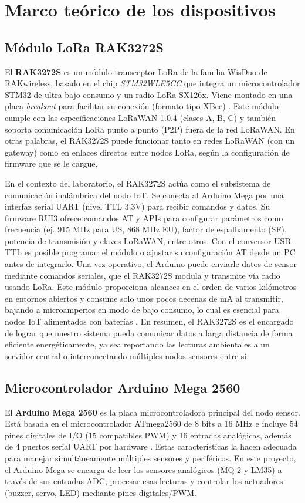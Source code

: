 \section{Marco teórico de los dispositivos}

\subsection{Módulo LoRa RAK3272S}
El \textbf{RAK3272S} es un módulo transceptor LoRa de la familia WisDuo de RAKwireless, basado en el chip \textit{STM32WLE5CC} que integra un microcontrolador STM32 de ultra bajo consumo y un radio LoRa SX126x. Viene montado en una placa \textit{breakout} para facilitar su conexión (formato tipo XBee) \cite{rak3272s2024}. Este módulo cumple con las especificaciones LoRaWAN 1.0.4 (clases A, B, C) y también soporta comunicación LoRa punto a punto (P2P) fuera de la red LoRaWAN. En otras palabras, el RAK3272S puede funcionar tanto en redes LoRaWAN (con un gateway) como en enlaces directos entre nodos LoRa, según la configuración de firmware que se le cargue.

En el contexto del laboratorio, el RAK3272S actúa como el subsistema de comunicación inalámbrica del nodo IoT. Se conecta al Arduino Mega por una interfaz serial UART (nivel TTL 3.3V) para recibir comandos y datos. Su firmware RUI3 ofrece comandos AT y APIs para configurar parámetros como frecuencia (ej. 915 MHz para US, 868 MHz EU), factor de espalhamento (SF), potencia de transmisión y claves LoRaWAN, entre otros. Con el conversor USB-TTL es posible programar el módulo o ajustar su configuración AT desde un PC antes de integrarlo. Una vez operativo, el Arduino puede enviarle datos de sensor mediante comandos seriales, que el RAK3272S modula y transmite vía radio usando LoRa. Este módulo proporciona alcances en el orden de varios kilómetros en entornos abiertos y consume solo unos pocos decenas de mA al transmitir, bajando a microamperios en modo de bajo consumo, lo cual es esencial para nodos IoT alimentados con baterías \cite{li2023early}. En resumen, el RAK3272S es el encargado de lograr que nuestro sistema pueda comunicar datos a larga distancia de forma eficiente energéticamente, ya sea reportando las lecturas ambientales a un servidor central o interconectando múltiples nodos sensores entre sí.

\subsection{Microcontrolador Arduino Mega 2560}
El \textbf{Arduino Mega 2560} es la placa microcontroladora principal del nodo sensor. Está basada en el microcontrolador ATmega2560 de 8 bits a 16 MHz e incluye 54 pines digitales de I/O (15 compatibles PWM) y 16 entradas analógicas, además de 4 puertos serial UART por hardware \cite{arduinoMega2560}. Estas características la hacen adecuada para manejar simultáneamente múltiples sensores y periféricos. En este proyecto, el Arduino Mega se encarga de leer los sensores analógicos (MQ-2 y LM35) a través de sus entradas ADC, procesar esas lecturas y controlar los actuadores (buzzer, servo, LED) mediante pines digitales/PWM.

